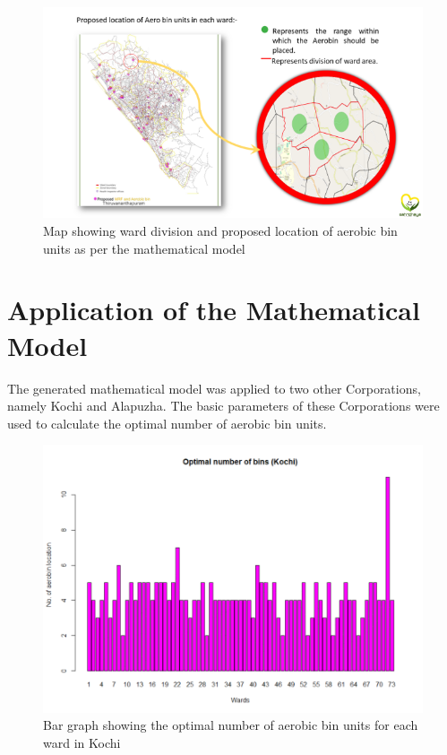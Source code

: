 \documentclass[12pt,a4paper]{report}
\begin{document}
\begin{figure}[H]
	\centering
	\includegraphics[width=1\linewidth]{bin_loc}
	\caption{Map showing ward division and proposed location of aerobic bin units as per the mathematical model}
	\label{fig:binloc}
\end{figure}

\section{\textbf{Application of the Mathematical Model}}
The generated mathematical model was applied to two other Corporations, namely Kochi and Alapuzha. The basic parameters of these Corporations were used to calculate the optimal number of aerobic bin units.

\begin{figure}[H]
	\centering
	\includegraphics[width=0.7\linewidth]{kochi}
	\caption{Bar graph showing the optimal number of aerobic bin units for each ward in Kochi}
	\label{fig:kochi}
\end{figure}
\end{document}
